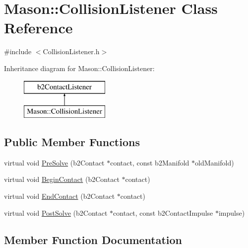 \hypertarget{class_mason_1_1_collision_listener}{}\section{Mason\+:\+:Collision\+Listener Class Reference}
\label{class_mason_1_1_collision_listener}


{\ttfamily \#include $<$Collision\+Listener.\+h$>$}

Inheritance diagram for Mason\+:\+:Collision\+Listener\+:\begin{figure}[H]
\begin{center}
\leavevmode
\includegraphics[height=2.000000cm]{class_mason_1_1_collision_listener}
\end{center}
\end{figure}
\subsection*{Public Member Functions}
\begin{DoxyCompactItemize}
\item 
virtual void \hyperlink{class_mason_1_1_collision_listener_accc6ff23dcbf8cbef31e68fe3c56837a}{Pre\+Solve} (b2\+Contact $\ast$contact, const b2\+Manifold $\ast$old\+Manifold)
\item 
virtual void \hyperlink{class_mason_1_1_collision_listener_afceef187bf2f12230da95c98699fef29}{Begin\+Contact} (b2\+Contact $\ast$contact)
\item 
virtual void \hyperlink{class_mason_1_1_collision_listener_a58250c23f5fe17721c186a9d22408576}{End\+Contact} (b2\+Contact $\ast$contact)
\item 
virtual void \hyperlink{class_mason_1_1_collision_listener_a974aee4f4b2068706e87a887c842eb66}{Post\+Solve} (b2\+Contact $\ast$contact, const b2\+Contact\+Impulse $\ast$impulse)
\end{DoxyCompactItemize}


\subsection{Member Function Documentation}
\hypertarget{class_mason_1_1_collision_listener_afceef187bf2f12230da95c98699fef29}{}\label{class_mason_1_1_collision_listener_afceef187bf2f12230da95c98699fef29} 
